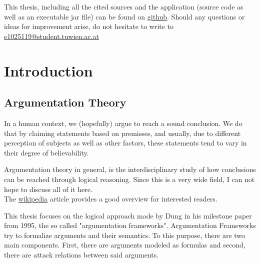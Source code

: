 \documentclass[12pt]{report}
\numberwithin{figure}{chapter}
\theoremstyle{break}
\newtheorem{elab}{Elaboration}[chapter]
\begin{document}
This thesis, including all the cited sources and the application (source code as well as an executable jar file) can be found on \href{https://github.com/e1025119/thesis}{github}.
Should any questions or ideas for improvement arise, do not hesitate to write to \href{mailto:e1025119@student.tuwien.ac.at}{e1025119@student.tuwien.ac.at}

\raggedright %
\chapter{Introduction}


\section{Argumentation Theory}
In a human context, we (hopefully) argue to reach a sound conclusion. We do that by claiming statements 
based on premisses, and usually, due to different perception of subjects as well as other factors,
these statements tend to vary in their degree of believability.

Argumentation theory in general, is the interdisciplinary study of how conclusions can be reached  through logical reasoning.
Since this is a very wide field, I can not hope to discuss all of it here.\\
 The \href{http://en.wikipedia.org/wiki/Argumentation_theory}{wikipedia} article provides a good overview
for interested readers.

This thesis focuses on the logical approach made by Dung \cite{Dung} in his milestone paper from 1995, the so called "argumentation frameworks".
Argumentation Frameworks try to formalize arguments and their semantics.
To this purpose, there are two main components. First, there are arguments modeled as formulas and second, there are attack relations between said arguments.
\end{document}
